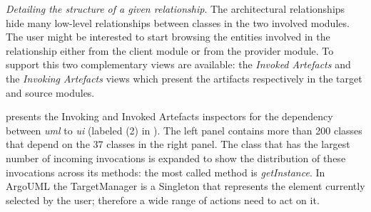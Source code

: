 \documentclass[preprint,12pt]{elsarticle}
\newcommand{\cd}[1]{{\em{#1}}}
\newcommand{\ra}{$\rightarrow$}
\newcommand{\chg}[2]{\textcolor{red}{\sout{#1}}{\ra}\textcolor{blue}{\uline{#2}}} %
\newcommand{\chg}[2]{#2}
\renewcommand{\chg}[2]{#2} %
\newcommand\on[1]{\nbc{ON}{#1}{red}} %
\begin{document}
\begin{description}

\item {\em Detailing the structure of a given relationship}. The architectural relationships hide many low-level relationships between classes in the two involved modules. The user might be interested to start browsing the entities involved in the relationship either from the client module or from the provider module. To support this two complementary views are available: the {\em Invoked Artefacts} and the {\em Invoking Artefacts} \chg{modules}{views} \on{or inspectors?} which present the artifacts respectively in the target and source modules. 


 presents the \chg{Invoked and Invoking}{Invoking and Invoked} Artefacts inspectors for the dependency between \cd{uml} to \cd{ui} (labeled (2) in ). The left panel contains more than 200 classes that depend on the 37 classes in the right panel. The class that has the largest number of incoming invocations is expanded to show the distribution of these invocations across its methods: the most called method is \cd{getInstance}. In ArgoUML the TargetManager is a Singleton that represents the element currently selected by the user; therefore a wide range of actions need to act on it.







\end{description}
\end{document}
